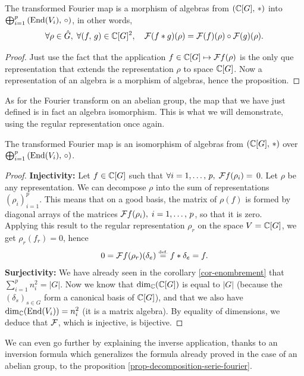  
\begin{prop}
 \label{notation-93} The transformed Fourier map is a morphism of algebras from $ (\mathbb{C} [G], \, *) $ into $ \bigoplus_{i = 1}^p{\left(\operatorname{End}(V_i), \, \circ \right)} $, in other words,
\begin{equation*}
\forall \rho \in \hat{G}, \; \forall (f, \, g) \in \mathbb{C} [G]^2, \quad \mathcal{F}(f * g) (\rho) = \mathcal{F}(f) (\rho) \circ \mathcal{F}(g) ( \rho).
\end{equation*}
\end{prop}
\begin{proof}
Just use the fact that the application $ f \in \mathbb{C} [G] \mapsto \mathcal{F} f(\rho) $ is the only \-que representation that extends the representation $ \rho $ to space $ \mathbb{C} [G] $. Now a representation of an algebra is a morphism of algebras, hence the proposition.
\end{proof}
As for the Fourier transform on an abelian group, the map that we have just defined is in fact an algebra isomorphism. This is what we will demonstrate, using the regular representation once again.
 
\begin{prop}
\label{prop-bijectivity-transf-fourier}
The transformed Fourier map is an isomorphism of algebras from $ (\mathbb{C} [G], \, *) $ over $ \bigoplus_{i = 1}^p{(\operatorname{End}(V_i), \, \circ) } $.
\end{prop}
\begin{proof}
\textbf{Injectivity:} Let $ f \in \mathbb{C} [G] $ such that $ \forall i = 1, \ldots, \, p, \; \mathcal{F} f(\rho_i) = $ 0. Let $ \rho $ be any representation. We can decompose $ \rho $ into the sum of representations $ (\rho_i)_{i = 1}^p $. This means that on a good basis, the matrix of $ \rho (f) $ is formed by diagonal arrays of the matrices $ \mathcal{F} f(\rho_i), \; i = 1, \ldots, \, p $, so that it is zero. \\Applying this result to the regular representation $ \rho_r $ on the space $ V = \mathbb{C} [G] $, we get $ \rho_r (f_r) = 0 $, hence
\begin{equation*}
0 = \mathcal{F} f(\rho_r) (\delta_e) \stackrel{\mbox{\upshape\tiny def.}}{=} f * \delta_e = f.
\end{equation*}
\textbf{Surjectivity:} We have already seen in the corollary \ref{cor-enombrement} that $ \sum_{i = 1}^p{n_i^2} = |G| $. Now we know that $ \dim_{\mathbb{C}} (\mathbb{C} [G]) $ is equal to $ |G| $ (because the $ (\delta_s)_{s \in G} $ form a canonical basis of $ \mathbb{C} [G] $), and that we also have $ \dim_{\mathbb{C}} (\operatorname{End}(V_i)) = n_i^2 $ (it is a matrix algebra). By equality of dimensions, we deduce that $ \mathcal{F} $, which is injective, is bijective.
\end{proof}
We can even go further by explaining the inverse application, thanks to an inversion formula which generalizes the formula already proved in the case of an abelian group, to the proposition \ref{prop-decomposition-serie-fourier}.
 
